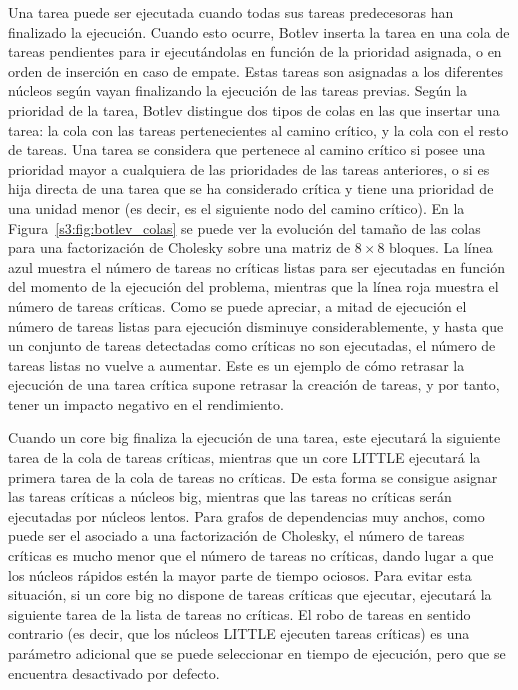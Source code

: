 Una tarea puede ser ejecutada cuando todas sus tareas predecesoras han
finalizado la ejecución. Cuando esto ocurre, Botlev inserta la tarea en una
cola de tareas pendientes para ir ejecutándolas en función de la prioridad
asignada, o en orden de inserción en caso de empate. Estas tareas son
asignadas a los diferentes núcleos según vayan finalizando la ejecución de
las tareas previas. Según la prioridad de la tarea, Botlev distingue dos
tipos de colas en las que insertar una tarea: la cola con las tareas
pertenecientes al camino crítico, y la cola con el resto de tareas. Una
tarea se considera que pertenece al camino crítico si posee una prioridad
mayor a cualquiera de las prioridades de las tareas anteriores, o si es
hija directa de una tarea que se ha considerado crítica y tiene una
prioridad de una unidad menor (es decir, es el siguiente nodo del camino
crítico). En la Figura~\ref{s3:fig:botlev_colas} se puede ver la evolución
del tamaño de las colas para una factorización de Cholesky sobre una matriz
de $8\times8$ bloques. La línea azul muestra el número de tareas no
críticas listas para ser ejecutadas en función del momento de la ejecución
del problema, mientras que la línea roja muestra el número de tareas
críticas. Como se puede apreciar, a mitad de ejecución el número de tareas
listas para ejecución disminuye considerablemente, y hasta que un conjunto
de tareas detectadas como críticas no son ejecutadas, el número de tareas
listas no vuelve a aumentar. Este es un ejemplo de cómo retrasar la
ejecución de una tarea crítica supone retrasar la creación de tareas, y por
tanto, tener un impacto negativo en el rendimiento.

Cuando un core big finaliza la ejecución de una tarea, este ejecutará la
siguiente tarea de la cola de tareas críticas, mientras que un core LITTLE
ejecutará la primera tarea de la cola de tareas no críticas. De esta forma
se consigue asignar las tareas críticas a núcleos big, mientras que las
tareas no críticas serán ejecutadas por núcleos lentos. Para grafos de
dependencias muy anchos, como puede ser el asociado a una factorización de
Cholesky, el número de tareas críticas es mucho menor que el número de
tareas no críticas, dando lugar a que los núcleos rápidos estén la mayor
parte de tiempo ociosos. Para evitar esta situación, si un core big no
dispone de tareas críticas que ejecutar, ejecutará la siguiente tarea de la
lista de tareas no críticas. El robo de tareas en sentido contrario (es
decir, que los núcleos LITTLE ejecuten tareas críticas) es una parámetro
adicional que se puede seleccionar en tiempo de ejecución, pero que se
encuentra desactivado por defecto.





